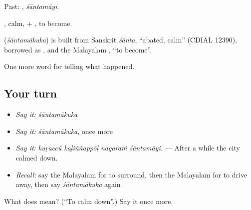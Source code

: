 Past: , \emph{śāntamāyi}.

, calm, + , to become.

\begin{cousinweb}
\textbf{} (\emph{śāntamākuka}) is built from Sanskrit \emph{śānta}, \textquotedblleft{}abated, calm\textquotedblright{} (CDIAL 12390), borrowed as , and the Malayalam , \textquotedblleft{}to become\textquotedblright{}.
\end{cousinweb}

\begin{grammarlens}[title={What you've built}]
One more word for telling what happened.
\end{grammarlens}

\subsection*{Your turn}
\begin{itemize}
\raggedright
  \item \emph{Say it:} \emph{śāntamākuka}
  \item \emph{Say it:} \emph{śāntamākuka}, once more
  \item \emph{Say it:} \emph{kuṟaccŭ kaḻiññappōḷ nagaraṁ śāntamāyi.} — After a while the city calmed down.
  \item \emph{Recall:} say the Malayalam for to surround, then the Malayalam for to drive away, then say \emph{śāntamākuka} again
\end{itemize}

\begin{tcolorbox}[breakable,colback=teal!4,colframe=teal!35!black,title={Before you move on}]
What does  mean? (\textquotedblleft{}To calm down\textquotedblright{}.) Say it once more.
\end{tcolorbox}
